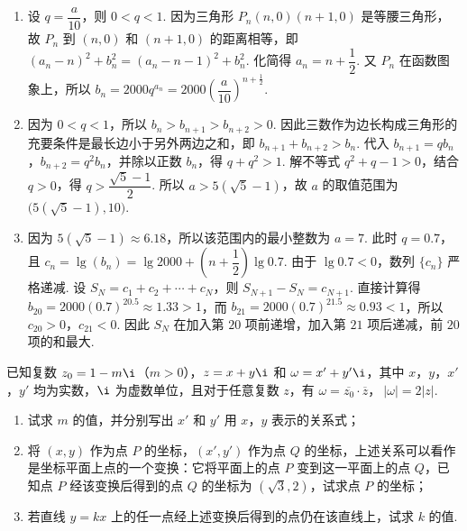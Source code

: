 \begin{solution}
\begin{enumerate}
\item 设 \(q=\dfrac{a}{10}\)，则 \(0<q<1\). 因为三角形 \(P_n(n,0)(n+1,0)\) 是等腰三角形，故 \(P_n\) 到 \((n,0)\) 和 \((n+1,0)\) 的距离相等，即
\((a_n-n)^2+b_n^2=(a_n-n-1)^2+b_n^2\).
化简得 \(a_n=n+\dfrac12\). 又 \(P_n\) 在函数图象上，所以 \(b_n=2000q^{a_n}=2000\left(\dfrac{a}{10}\right)^{n+\frac12}\).
\item 因为 \(0<q<1\)，所以 \(b_n>b_{n+1}>b_{n+2}>0\). 因此三数作为边长构成三角形的充要条件是最长边小于另外两边之和，即 \(b_{n+1}+b_{n+2}>b_n\). 代入 \(b_{n+1}=qb_n\)，\(b_{n+2}=q^2b_n\)，并除以正数 \(b_n\)，得 \(q+q^2>1\). 解不等式 \(q^2+q-1>0\)，结合 \(q>0\)，得 \(q>\dfrac{\sqrt{5}-1}{2}\). 所以 \(a>5(\sqrt{5}-1)\)，故 \(a\) 的取值范围为 \(\bigl(5(\sqrt{5}-1),10\bigr)\).
\item 因为 \(5(\sqrt{5}-1)\approx6.18\)，所以该范围内的最小整数为 \(a=7\). 此时 \(q=0.7\)，且 \(c_n=\lg(b_n)=\lg2000+\left(n+\dfrac12\right)\lg0.7\). 由于 \(\lg0.7<0\)，数列 \(\{c_n\}\) 严格递减. 设 \(S_N=c_1+c_2+\cdots+c_N\)，则 \(S_{N+1}-S_N=c_{N+1}\). 直接计算得 \(b_{20}=2000(0.7)^{20.5}\approx1.33>1\)，而 \(b_{21}=2000(0.7)^{21.5}\approx0.93<1\)，所以 \(c_{20}>0\)，\(c_{21}<0\). 因此 \(S_N\) 在加入第 \(20\) 项前递增，加入第 \(21\) 项后递减，前 \(20\) 项的和最大.
\end{enumerate}
\end{solution}

\begin{problem}
已知复数 \(z_0=1-m\i\)（\(m>0\)），\(z=x+y\i\) 和 \(\omega=x'+y'\i\)，其中 \(x\)，\(y\)，\(x'\)，\(y'\) 均为实数，\(\i\) 为虚数单位，且对于任意复数 \(z\)，有 \(\omega=\overline{z_0}\cdot\overline{z}\)，\(\ |\omega|=2|z|\).
\begin{enumerate}
\item 试求 \(m\) 的值，并分别写出 \(x'\) 和 \(y'\) 用 \(x\)，\(y\) 表示的关系式；
\item 将 \((x,y)\) 作为点 \(P\) 的坐标，\((x',y')\) 作为点 \(Q\) 的坐标，上述关系可以看作是坐标平面上点的一个变换：它将平面上的点 \(P\) 变到这一平面上的点 \(Q\)，已知点 \(P\) 经该变换后得到的点 \(Q\) 的坐标为 \((\sqrt{3},2)\)，试求点 \(P\) 的坐标；
\item 若直线 \(y=kx\) 上的任一点经上述变换后得到的点仍在该直线上，试求 \(k\) 的值.
\end{enumerate}
\end{problem}

